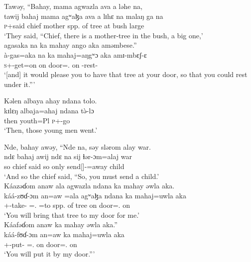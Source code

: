 \ea     Tawəy,  “Bahay,  mama  agwazla  ava  a  ləhe  na,   \\
\gll tawij bahaj mama   agʷaɮa       ava  a   lɪhɛ  na   malaŋ ga  na\\
  \textsc{p}+said  chief   mother   {spp. of tree}  {\EXT}   at   bush    {\PSP}  large     {\ADJ}  {\PSP}\\
 \glt ‘They said, “Chief, there is a mother-tree in the bush, a big one,’\\
 
 \medskip
 agasaka  na  ka  mahay  ango  aka  aməmbese.”\\
\gll 	à-gas=aka   na  ka    mahaj=aŋgʷɔ aka  amɪ-mbɛʃ-ɛ\\
	\textsc{s}+{\PFV}-get=on  {\PSP}   on     door={\twoS}.{\POSS}  on  {\DEP}-rest-{\CL}\\
 \glt ‘[and] it would please you to have that tree at your door, so that you could rest under it.”’
 \z

\ea     Kəlen  albaya  ahay  ndana  tolo.  \\
 \gll kɪlɛŋ  albaja=ahaj  ndana  t\`ə-lɔ\\
 then   youth=Pl     {\DEM}   \textsc{p}+{\PFV}-go\\ 
 \glt ‘Then, those young men went.’
 \z

\ea     Nde, bahay awəy,  “Nde na,  səy  slərom  alay  war.\\
 \gll ndɛ bahaj   awij     ndɛ  na  sij  ɬər-ɔm=alaj         war\\
 so    chief  said  so  {\PSP}  only  {send[{\IMP}]-{\twoP}}=away   child\\
  \glt ‘And so the chief said, “So, you must send a child.’\\
  
  \medskip
  Káazəɗom  anaw  ala  agwazla  ndana  ka  mahay  əwla  aka.\\
  \gll káá{}-zʊɗ{}-ɔm    an=aw    =ala    agʷaɮa    ndana    ka   mahaj=uwla      aka\\
  {\twoP}+{\POT}-take-{\twoP}      {\DAT}={\oneS}.{\IO}  =to       {spp. of tree}   {\DEM}   on   door={\oneS}.{\POSS}  on\\
  \glt ‘You will bring that tree to my door for me.’\\
  
  \medskip
 Káafəɗom  anaw  ka  mahay  əwla  aka.”\\
 \gll káá{}-fʊɗ{}-ɔm          an=aw      ka   mahaj=uwla     aka\\
  {\twoP}+{\POT}-put-{\twoP}    {\DAT}={\oneS}.{\IO}   on  door={\oneS}.{\POSS}   on\\
  \glt ‘You will put it by my door.”’ 
  \z

